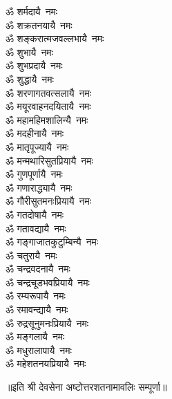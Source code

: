 \begin{flushleft}
\begin{multicols}{2}
ॐ शर्मदायै~नमः\\
ॐ शक्रतनयायै~नमः\\
ॐ शङ्करात्मजवल्लभायै~नमः\\
ॐ शुभायै~नमः\\
ॐ शुभप्रदायै~नमः\\
ॐ शुद्धायै~नमः\\
ॐ शरणागतवत्सलायै~नमः\\
ॐ मयूरवाहनदयितायै~नमः\\
ॐ महामहिमशालिन्यै~नमः\hfill{}\\
ॐ मदहीनायै~नमः\\
ॐ मातृपूज्यायै~नमः\\
ॐ मन्मथारिसुतप्रियायै~नमः\\
ॐ गुणपूर्णायै~नमः\\
ॐ गणाराद्ध्यायै~नमः\\
ॐ गौरीसुतमनःप्रियायै~नमः\\
ॐ गतदोषायै~नमः\\
ॐ गतावद्यायै~नमः\\
ॐ गङ्गाजातकुटुम्बिन्यै~नमः\\
ॐ चतुरायै~नमः\hfill{}\\
ॐ चन्द्रवदनायै~नमः\\
ॐ चन्द्रचूडभवप्रियायै~नमः\\
ॐ रम्यरूपायै~नमः\\
ॐ रमावन्द्यायै~नमः\\
ॐ रुद्रसूनुमनःप्रियायै~नमः\\
ॐ मङ्गलायै~नमः\\
ॐ मधुरालापायै~नमः\\
ॐ महेशतनयप्रियायै~नमः\\
\end{multicols}
\end{flushleft}
॥इति श्री देवसेना अष्टोत्तरशतनामावलिः सम्पूर्णा॥
